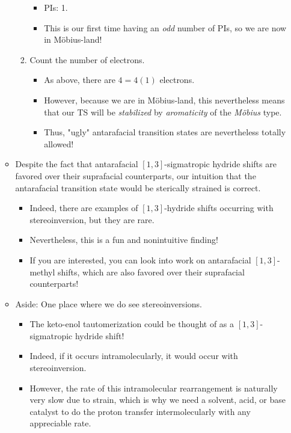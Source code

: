 \documentclass[../notes.tex]{subfiles}
\begin{document}
\begin{itemize}
\begin{itemize}
\begin{enumerate}
\begin{itemize}
                \item PIs: 1.
                \item This is our first time having an \emph{odd} number of PIs, so we are now in M\"{o}bius-land!
            \end{itemize}
            \item Count the number of electrons.
            \begin{itemize}
                \item As above, there are $4=4(1)$ electrons.
                \item However, because we are in M\"{o}bius-land, this nevertheless means that our TS will be \emph{stabilized} by \emph{aromaticity} of the \emph{M\"{o}bius} type.
                \item Thus, "ugly" antarafacial transition states are nevertheless totally allowed!
            \end{itemize}
        \end{enumerate}
        \item Despite the fact that antarafacial $[1,3]$-sigmatropic hydride shifts are favored over their suprafacial counterparts, our intuition that the antarafacial transition state would be sterically strained is correct.
        \begin{itemize}
            \item Indeed, there are examples of $[1,3]$-hydride shifts occurring with stereoinversion, but they are rare.
            \item Nevertheless, this is a fun and nonintuitive finding!
            \item If you are interested, you can look into work on antarafacial $[1,3]$-methyl shifts, which are also favored over their suprafacial counterparts!
        \end{itemize}
        \item Aside: One place where we do see stereoinversions.
        \begin{itemize}
            \item The keto-enol tautomerization could be thought of as a $[1,3]$-sigmatropic hydride shift!
            \item Indeed, if it occurs intramolecularly, it would occur with stereoinversion.
            \item However, the rate of this intramolecular rearrangement is naturally very slow due to strain, which is why we need a solvent, acid, or base catalyst to do the proton transfer intermolecularly with any appreciable rate.

\end{itemize}
\end{itemize}
\end{itemize}
\end{document}
